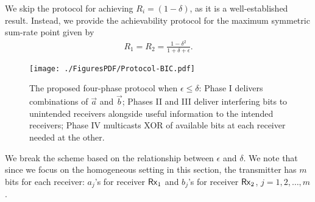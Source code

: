 \documentclass[journal,12pt,draftcls,onecolumn]{IEEEtran}
\newcommand{\lp}{\left(}
\newcommand{\rp}{\right)}
\begin{document}
We skip the protocol for achieving $R_ i = \lp 1 - \delta \rp$, as it is a well-established result. Instead, we provide the achievability protocol for the maximum symmetric sum-rate point given by
\begin{align}
\label{Eq:MaxSumRate}
R_1 = R_2 = \frac{1-\delta^2}{1+\delta+\epsilon}.
\end{align}

\begin{figure*}[!t]
\centering
\texttt{[image: ./FiguresPDF/Protocol-BIC.pdf]}
\caption{The proposed four-phase protocol when $\epsilon \leq \delta$: Phase I delivers combinations of $\vec{a}$ and $\vec{b}$; Phases II and III deliver interfering bits to unintended receivers alongside useful information to the intended receivers; Phase IV multicasts XOR of available bits at each receiver needed at the other.\label{Fig:Protocol-BIC}}
\end{figure*}

We break the scheme based on the relationship between $\epsilon$ and $\delta$. We note that since we focus on the homogeneous setting in this section, the transmitter has $m$ bits for each receiver: $a_j$'s for receiver ${\sf Rx}_1$ and $b_j$'s for receiver ${\sf Rx}_2$, $j=1,2,\ldots,m$. %
\end{document}
